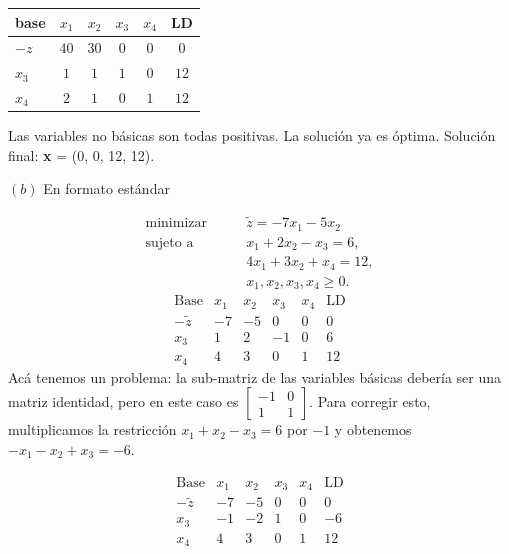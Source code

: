 \documentclass[12pt]{article}
\begin{document}
\begin{table}[h]

\centering

\begin{tabular}{lcccc|c}

\toprule

base & $x_1$ & $x_2$ & $x_3$ & $x_4$ &  LD \\

\midrule

$-z$  & $40$ & $30$ & $0$ & $0$  & $0$ \\
\midrule
$x_3$ & $1$ & $1$  & $1$ & $0$  & $12$ \\

$x_4$ & $2$ & $1$  & $0$ & $1$  & $12$ \\

\bottomrule

\end{tabular}

\end{table}

Las variables no básicas son todas positivas. La solución ya es óptima. 
Solución final: \textbf{x} = (0, 0, 12, 12).

$(b)$ En formato estándar

\[
\begin{aligned}
\text{minimizar} \qquad & \tilde z = -7x_1-5x_2\\[0.5em]
\text{sujeto a} \qquad
&x_1+2x_2-x_3=6,\\
&4x_1+3x_2+x_4=12,\\
&x_1,x_2,x_3,x_4\ge0.
\end{aligned}
\]
\[
\begin{array}{c|cccc|c}
\text{Base} & x_1 & x_2 & x_3 & x_4 & \text{LD}\\
\hline
-\tilde z & -7 & -5 & 0 & 0 & 0\\
x_3 & 1 & 2 & -1 & 0 & 6\\
x_4 & 4 & 3 & 0 & 1 & 12
\end{array}
\]
Acá tenemos un problema: la sub-matriz de las variables básicas debería ser una
matriz identidad, pero en este caso es $\begin{bmatrix} 
    -1 & 0 \\ 1 & 1 
\end{bmatrix} $. Para corregir esto, multiplicamos la restricción $x_1 +x_2 -
x_3 = 6$ por $-1$ y obtenemos $-x_1-x_2 + x_3 = -6$. 

\[
\begin{array}{c|cccc|c}
\text{Base} & x_1 & x_2 & x_3 & x_4 & \text{LD}\\
\hline
-\tilde z & -7 & -5 & 0 & 0 & 0\\
x_3 & -1 & -2 & 1 & 0 & -6\\
x_4 & 4 & 3 & 0 & 1 & 12
\end{array}
\]
\end{document}
